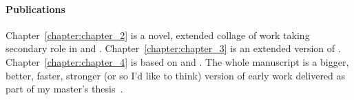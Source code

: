 {\paragraph{Publications}
Chapter~\ref{chapter:chapter_2} is a novel, extended collage of work taking secondary role in \citet{kogkalidis-etal-2020-aethel} and \citet{rouss}.
Chapter~\ref{chapter:chapter_3} is an extended version of \citet{kogkalidis-etal-2020-aethel}.
Chapter~\ref{chapter:chapter_4} is based on \citet{kogkalidis-etal-2019-constructive,kogkalidis-etal-2020-neural} and \citet[preprint]{kogkalidis2022geometryaware}.
The whole manuscript is a bigger, better, faster, stronger (or so I'd like to think) version of early work delivered as part of my master's thesis~\cite{https://doi.org/10.48550/arxiv.1909.02955}.




}